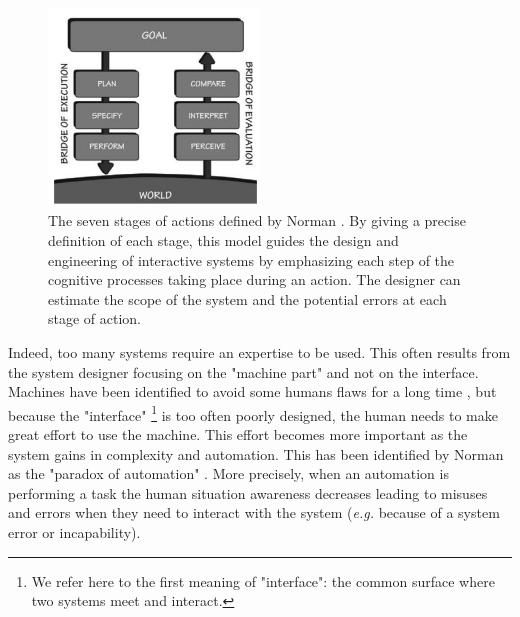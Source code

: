 \documentclass[a4paper,11pt,twoside]{StyleThese}
\begin{document}
\begin{figure}
\centering
\includegraphics[width=0.5\textwidth]{figures/chapter1/Norman_7_stages_action.png}
\caption{The seven stages of actions defined by Norman \cite{norman2013design}. By giving a precise definition of each stage, this model guides the design and engineering of interactive systems by emphasizing each step of the cognitive processes taking place during an action. The designer can estimate the scope of the system and the potential errors at each stage of action.}
\label{fig:norman_7_stages}
\end{figure}

Indeed, too many systems require an expertise to be used. This often results from the system designer focusing on the "machine part" and not on the interface. Machines have been identified to avoid some humans flaws for a long time \cite{fitts_human_1951}, but because the "interface" \footnote{We refer here to the first meaning of "interface": the common surface where two systems meet and interact.} is too often poorly designed, the human needs to make great effort to use the machine. This effort becomes more important as the system gains in complexity and automation. This has been identified by Norman as the "paradox of automation" \cite{norman2013design}. More precisely, when an automation is performing a task the human situation awareness \cite{endsley_design_1988} decreases leading to misuses and errors when they need to interact with the system (\textit{e.g.} because of a system error or incapability).
\end{document}
